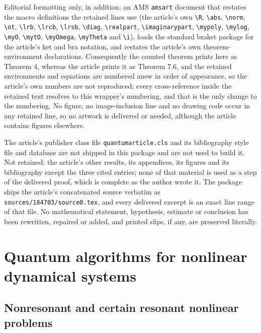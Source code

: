 \documentclass[10pt,a4paper]{amsart}
\theoremstyle{plain}
\theoremstyle{definition}
\theoremstyle{remark}
\begin{document}
Editorial formatting only, in addition: an AMS \texttt{amsart} document that restates the macro definitions the retained lines use (the article's own \texttt{\textbackslash R}, \texttt{\textbackslash abs}, \texttt{\textbackslash norm}, \texttt{\textbackslash ot}, \texttt{\textbackslash lrb}, \texttt{\textbackslash lrcb}, \texttt{\textbackslash lrsb}, \texttt{\textbackslash diag}, \texttt{\textbackslash realpart}, \texttt{\textbackslash imaginarypart}, \texttt{\textbackslash mypoly}, \texttt{\textbackslash mylog}, \texttt{\textbackslash myO}, \texttt{\textbackslash mytO}, \texttt{\textbackslash myOmega}, \texttt{\textbackslash myTheta} and \texttt{\textbackslash i}), loads the standard braket package for the article's ket and bra notation, and restates the article's own theorem-environment declarations. Consequently the counted theorem prints here as Theorem 4, whereas the article prints it as Theorem 7.6, and the retained environments and equations are numbered anew in order of appearance, so the article's own numbers are not reproduced; every cross-reference inside the retained text resolves to this wrapper's numbering, and that is the only change to the numbering. No figure, no image-inclusion line and no drawing code occur in any retained line, so no artwork is delivered or needed, although the article contains figures elsewhere.

The article's publisher class file \texttt{quantumarticle.cls} and its bibliography style file and database are not shipped in this package and are not used to build it. Not retained: the article's other results, its appendices, its figures and its bibliography except the three cited entries; none of that material is used as a step of the delivered proof, which is complete as the author wrote it. The package ships the article's concatenated source verbatim as \texttt{sources/184703/source0.tex}, and every delivered excerpt is an exact line range of that file. No mathematical statement, hypothesis, estimate or conclusion has been rewritten, repaired or added, and printed slips, if any, are preserved literally.
\section{Quantum algorithms for nonlinear dynamical systems}

\subsection{Nonresonant and certain resonant nonlinear problems}
\label{subsec:quantum_algorithm_nonresonant_systems}
\end{document}
